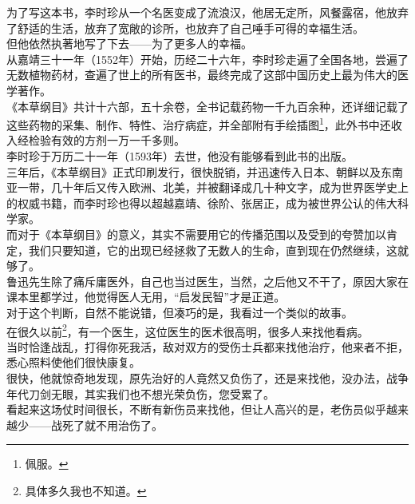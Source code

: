 \begin{multicols}{\theparacolNo}
为了写这本书，李时珍从一个名医变成了流浪汉，他居无定所，风餐露宿，他放弃了舒适的生活，放弃了宽敞的诊所，也放弃了自己唾手可得的幸福生活。\\

但他依然执著地写了下去——为了更多人的幸福。\\

从嘉靖三十一年（1552年）开始，历经二十六年，李时珍走遍了全国各地，尝遍了无数植物药材，查遍了世上的所有医书，最终完成了这部中国历史上最为伟大的医学著作。\\

《本草纲目》共计十六部，五十余卷，全书记载药物一千九百余种，还详细记载了这些药物的采集、制作、特性、治疗病症，并全部附有手绘插图\footnote{佩服。}，此外书中还收入经检验有效的方剂一万一千多则。\\

李时珍于万历二十一年（1593年）去世，他没有能够看到此书的出版。\\

三年后，《本草纲目》正式印刷发行，很快脱销，并迅速传入日本、朝鲜以及东南亚一带，几十年后又传入欧洲、北美，并被翻译成几十种文字，成为世界医学史上的权威书籍，而李时珍也得以超越嘉靖、徐阶、张居正，成为被世界公认的伟大科学家。\\

而对于《本草纲目》的意义，其实不需要用它的传播范围以及受到的夸赞加以肯定，我们只要知道，它的出现已经拯救了无数人的生命，直到现在仍然继续，这就够了。\\

鲁迅先生除了痛斥庸医外，自己也当过医生，当然，之后他又不干了，原因大家在课本里都学过，他觉得医人无用，“启发民智”才是正道。\\

对于这个判断，自然不能说错，但凑巧的是，我看过一个类似的故事。\\

在很久以前\footnote{具体多久我也不知道。}，有一个医生，这位医生的医术很高明，很多人来找他看病。\\

当时恰逢战乱，打得你死我活，敌对双方的受伤士兵都来找他治疗，他来者不拒，悉心照料使他们很快康复。\\

很快，他就惊奇地发现，原先治好的人竟然又负伤了，还是来找他，没办法，战争年代刀剑无眼，其实我们也不想光荣负伤，您受累了。\\

看起来这场仗时间很长，不断有新伤员来找他，但让人高兴的是，老伤员似乎越来越少——战死了就不用治伤了。\\


\end{multicols}
